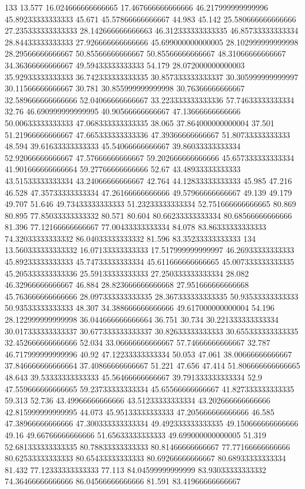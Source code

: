 133 13.577 16.024666666666665 17.467666666666666 46.217999999999996 45.89233333333333 45.671 45.57866666666667 44.983 45.142 25.580666666666666 27.235333333333333 28.142666666666663 46.312333333333335 46.85733333333334 28.84433333333333 27.926666666666666 45.699000000000005 28.102999999999998 28.29566666666667 50.85566666666667 50.85566666666667 48.31066666666667 34.36366666666667 49.59433333333333 54.179 28.072000000000003 35.92933333333333 36.742333333333335 30.857333333333337 30.305999999999997 30.11566666666667 30.781 30.855999999999998 30.76366666666667 32.589666666666666 52.04066666666667 33.223333333333336 57.74633333333334 32.76 46.690999999999995 40.90566666666667 47.13666666666666 50.00633333333333 47.068333333333335 38.065 37.864000000000004 37.501 51.21966666666667 47.665333333333336 47.39366666666667 51.80733333333333 48.594 39.61633333333333 45.54066666666667 39.86033333333334 52.92066666666667 47.57666666666667 59.202666666666666 45.657333333333334 41.901666666666664 59.27766666666666 52.67 43.48933333333333 43.51533333333334 43.24066666666667 42.764 44.12833333333333 45.985 47.216 46.528 47.35733333333334 47.26166666666666 49.57966666666667 49.139 49.179 49.707 51.646 49.73433333333333 51.23233333333334 52.751666666666665 80.869 80.895 77.85033333333332 80.571 80.604 80.66233333333334 80.68566666666666 81.396 77.12166666666667 77.00433333333334 84.078 83.86333333333333 74.32033333333332 86.04033333333332 81.596 83.35233333333333
134 13.560333333333332 16.07133333333333 17.517999999999997 46.26933333333333 45.89233333333333 45.74733333333334 45.611666666666665 45.007333333333335 45.205333333333336 25.59133333333333 27.250333333333334 28.082 46.32966666666667 46.884 28.823666666666668 27.951666666666668 45.763666666666666 28.097333333333335 28.367333333333335 50.93533333333333 50.93533333333333 48.307 34.388666666666666 49.617000000000004 54.196 28.122999999999998 36.044666666666664 36.751 30.734 30.221333333333334 30.017333333333337 30.677333333333337 30.82633333333333 30.655333333333335 32.452666666666666 52.034 33.06666666666667 57.74666666666667 32.787 46.717999999999996 40.92 47.12233333333334 50.053 47.061 38.00666666666667 37.846666666666664 37.40866666666667 51.221 47.656 47.414 51.806666666666665 48.643 39.53333333333333 45.56466666666667 39.791333333333334 52.9 47.559666666666665 59.23733333333334 45.65566666666667 41.827333333333335 59.313 52.736 43.49966666666666 43.51233333333334 43.202666666666666 42.815999999999995 44.073 45.95133333333333 47.205666666666666 46.585 47.38966666666666 47.300333333333334 49.492333333333335 49.150666666666666 49.16 49.66766666666666 51.65633333333333 49.699000000000005 51.319 52.681333333333335 80.78833333333333 80.81466666666667 77.77166666666666 80.62533333333333 80.65433333333333 80.69266666666667 80.68933333333334 81.432 77.12333333333333 77.113 84.04599999999999 83.93033333333332 74.36466666666666 86.04566666666666 81.591 83.41966666666667

